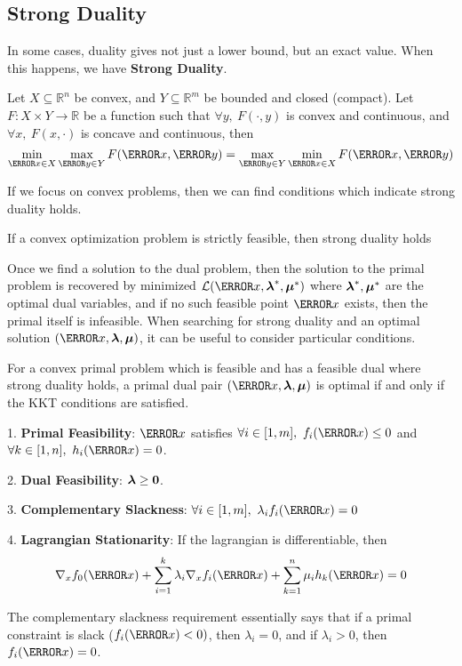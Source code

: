 \subsection{Strong Duality}
In some cases, duality gives not just a lower bound, but an exact value.
When this happens, we have \textbf{Strong Duality}.
\begin{theorem}
	Let $X\subseteq\mathbb{R}^n$ be convex, and $Y\subseteq\mathbb{R}^m$ be bounded and closed (compact). Let $F:X \times Y \to \mathbb{R}$ be a function such that $\forall y,\ F(\cdot, y)$ is convex and continuous, and $\forall x,\ F(x, \cdot)$ is concave and continuous, then
	\[	
		\min_{\V{x}\in X}\max_{\V{y}\in Y} F(\V{x}, \V{y}) = \max_{\V{y}\in Y}\min_{\V{x}\in X}F(\V{x}, \V{y})
	\]
	\label{thm:scion-minimax}
\end{theorem}
If we focus on convex problems, then we can find conditions which indicate strong duality holds.
\begin{theorem}
	If a convex optimization problem is strictly feasible, then strong duality holds
	\label{thm:slaters-condition}
\end{theorem}
Once we find a solution to the dual problem, then the solution to the primal problem is recovered by minimized $\mathcal{L}(\V{x}, \bs{\lambda}^*, \bs{\mu}^*)$ where $\boldsymbol{\lambda}^*,\boldsymbol{\mu}^*$ are the optimal dual variables, and if no such feasible point $\V{x}$ exists, then the primal itself is infeasible.
When searching for strong duality and an optimal solution $(\V{x}, \bs{\lambda}, \bs{\mu})$, it can be useful to consider particular conditions.
\begin{theorem}
	For a convex primal problem which is feasible and has a feasible dual where strong duality holds, a primal dual pair $(\V{x}, \bs{\lambda}, \bs{\mu})$ is optimal if and only if the KKT conditions are satisfied.

	1. \textbf{Primal Feasibility}: $\V{x}$ satisfies $\forall i\in[1,m],\ f_i(\V{x}) \leq 0$ and $\forall k\in[1,n],\ h_i(\V{x}) = 0$.
	
	2. \textbf{Dual Feasibility}: $\boldsymbol{\lambda} \geq \boldsymbol{0}$.
	
	3. \textbf{Complementary Slackness}: $\forall i\in[1,m],\ \lambda_if_i(\V{x}) = 0$
	
	4. \textbf{Lagrangian Stationarity}: If the lagrangian is differentiable, then \[
			\nabla_xf_0(\V{x}) +\sum_{i=1}^k\lambda_i\nabla_xf_i(\V{x}) + \sum_{k=1}^n\mu_ih_k(\V{x})=0
		\]
	\label{thm:kkt}
\end{theorem}
The complementary slackness requirement essentially says that if a primal constraint is slack ($f_i(\V{x}) < 0)$, then $\lambda_i=0$, and if $\lambda_i > 0$, then $f_i(\V{x}) = 0$.


